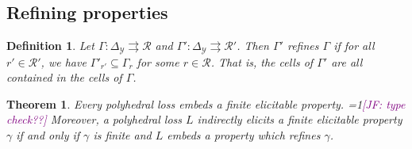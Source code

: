 \documentclass[12pt]{article}
\newcommand{\Comments}{1}
\newcommand{\mynote}[2]{\ifnum\Comments=1\textcolor{#1}{#2}\fi}
\newcommand{\jessie}[1]{\mynote{purple}{[JF: #1]}}
\newcommand{\simplex}{\Delta_\Y}
\newcommand{\R}{\mathcal{R}}
\newcommand{\Y}{\mathcal{Y}}
\newcommand{\toto}{\rightrightarrows}
\newtheorem{theorem}{Theorem}
\newtheorem{definition}{Definition}
\begin{document}
\subsection{Refining properties}

\begin{definition}
	Let $\Gamma:\simplex \toto \R$ and $\Gamma':\simplex\toto \R'$.
	Then $\Gamma'$ \emph{refines} $\Gamma$ if for all $r' \in \R'$, we have $\Gamma'_{r'} \subseteq \Gamma_r$ for some $r \in \R$.
	That is, the cells of $\Gamma'$ are all contained in the cells of $\Gamma$.
\end{definition}

\begin{theorem}
	Every polyhedral loss embeds a finite elicitable property. \jessie{type check??}
	Moreover, a polyhedral loss $L$ indirectly elicits a finite elicitable property $\gamma$ if and only if $\gamma$ is finite and $L$ embeds a property which refines $\gamma$.
\end{theorem}
\end{document}
